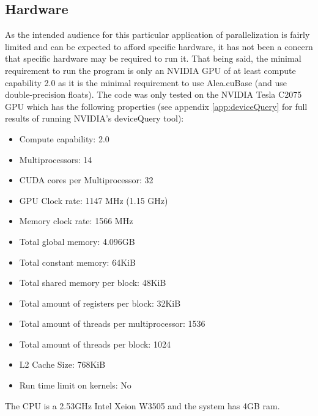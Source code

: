 \subsection{Hardware}\label{subsec:background:hardware}
As the intended audience for this particular application of parallelization is fairly limited and can be expected to afford specific hardware, it has not been a concern that specific hardware may be required to run it.
That being said, the minimal requirement to run the program is only an NVIDIA GPU of at least compute capability 2.0 as it is the minimal requirement to use Alea.cuBase (and use double-precision floats).
The code was only tested on the NVIDIA Tesla C2075 GPU which has the following properties (see appendix \ref{app:deviceQuery} for full results of running NVIDIA's deviceQuery tool):

\begin{itemize}
\item Compute capability: 2.0
\item Multiprocessors: 14
\item CUDA cores per Multiprocessor: 32
\item GPU Clock rate: 1147 MHz (1.15 GHz)
\item Memory clock rate: 1566 MHz
\item Total global memory: 4.096GB
\item Total constant memory: 64KiB
\item Total shared memory per block: 48KiB
\item Total amount of registers per block: 32KiB
\item Total amount of threads per multiprocessor: 1536
\item Total amount of threads per block: 1024
\item L2 Cache Size: 768KiB
\item Run time limit on kernels: No
\end{itemize}

The CPU is a 2.53GHz Intel Xeion W3505 and the system has 4GB ram.